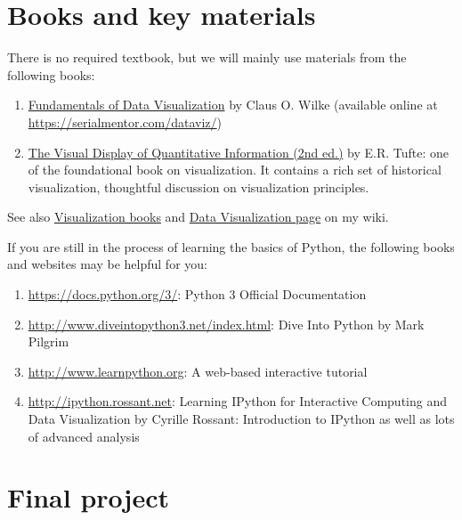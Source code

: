 \documentclass[11pt,article,oneside]{memoir} %
\begin{document}
\section{Books and key materials}%

There is no required textbook, but we will mainly use materials from the following books:

\begin{enumerate}
    
\item \href{https://serialmentor.com/dataviz/}{Fundamentals of Data Visualization} by Claus O. Wilke (available online at \url{https://serialmentor.com/dataviz/})

\item \href{http://www.amazon.com/gp/product/0961392142}{The Visual Display of Quantitative Information (2nd ed.)} by E.R. Tufte: one of the foundational book on visualization. It contains a rich set of historical visualization, thoughtful discussion on visualization principles. 

\end{enumerate}

See also \href{https://yyiki.org/wiki/Data%20visualization/Books/}{Visualization books} and \href{https://yyiki.org/wiki/Data%20visualization/}{Data Visualization page} on my wiki. 


If you are still in the process of learning the basics of Python, the following books and websites may be helpful for you:

\begin{enumerate}%

\item \url{https://docs.python.org/3/}: Python 3 Official Documentation

\item \url{http://www.diveintopython3.net/index.html}: Dive Into Python by Mark Pilgrim 

\item \url{http://www.learnpython.org}: A web-based interactive tutorial 

\item \url{http://ipython.rossant.net}: Learning IPython for Interactive Computing and Data Visualization by Cyrille Rossant: Introduction to IPython as well as lots of advanced analysis 

\end{enumerate}%


\section{Final project}%
\end{document}
